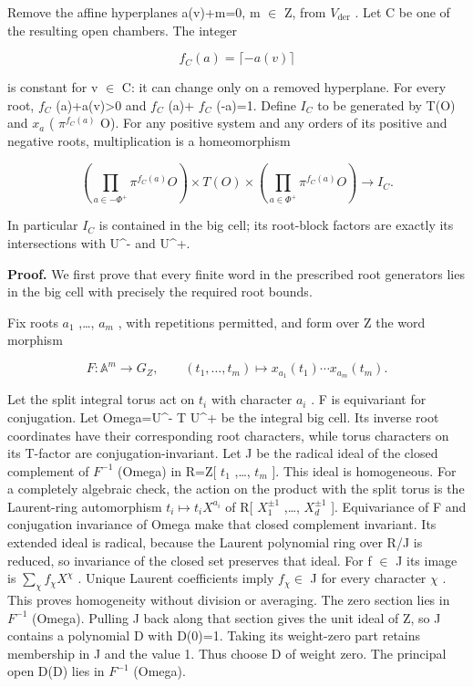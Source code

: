 \documentclass[
  11pt,
]{article}
\begin{document}
Remove the affine hyperplanes a(v)+m=0, m \(\in\) Z, from
\(V_{\mathrm{der}}\) . Let C be one of the resulting open chambers. The
integer

\[
 f_C(a)=\lceil-a(v)\rceil
\]

is constant for v \(\in\) C: it can change only on a removed hyperplane.
For every root, \(f_{C}\) (a)+a(v)\textgreater0 and \(f_{C}\) (a)+
\(f_{C}\) (-a)=1. Define \(I_{C}\) to be generated by T(O) and \(x_{a}\)
( \(\pi^{f_{C}(a)}\) O). For any positive system and any orders of its
positive and negative roots, multiplication is a homeomorphism

\[
 \left(\prod_{a\in-\Phi^+}\pi^{f_C(a)}O\right)
 \times T(O)\times
 \left(\prod_{a\in\Phi^+}\pi^{f_C(a)}O\right)
 \longrightarrow I_C.
 \tag{BF.11}
\]

In particular \(I_{C}\) is contained in the big cell; its root-block
factors are exactly its intersections with U\^{}- and U\^{}+.

\textbf{Proof.} We first prove that every finite word in the prescribed
root generators lies in the big cell with precisely the required root
bounds.

Fix roots \(a_{1}\) ,\ldots, \(a_{m}\) , with repetitions permitted, and
form over Z the word morphism

\[
 F:\mathbb A^m\to G_Z,\qquad
 (t_1,\ldots,t_m)\mapsto x_{a_1}(t_1)\cdots x_{a_m}(t_m).
\]

Let the split integral torus act on \(t_{i}\) with character \(a_{i}\) .
F is equivariant for conjugation. Let Omega=U\^{}- T U\^{}+ be the
integral big cell. Its inverse root coordinates have their corresponding
root characters, while torus characters on its T-factor are
conjugation-invariant. Let J be the radical ideal of the closed
complement of \(F^{-1}\) (Omega) in R=Z{[} \(t_{1}\) ,\ldots, \(t_{m}\)
{]}. This ideal is homogeneous. For a completely algebraic check, the
action on the product with the split torus is the Laurent-ring
automorphism \(t_{i} \mapsto t_{i} X^{a_{i}}\) of R{[} \(X_{1}^{±1}\)
,\ldots, \(X_{d}^{±1}\) {]}. Equivariance of F and conjugation
invariance of Omega make that closed complement invariant. Its extended
ideal is radical, because the Laurent polynomial ring over R/J is
reduced, so invariance of the closed set preserves that ideal. For f
\(\in\) J its image is \(\sum_{\chi} f_{\chi} X^\chi\) . Unique Laurent
coefficients imply \(f_{\chi} \in\) J for every character \(\chi\) .
This proves homogeneity without division or averaging. The zero section
lies in \(F^{-1}\) (Omega). Pulling J back along that section gives the
unit ideal of Z, so J contains a polynomial D with D(0)=1. Taking its
weight-zero part retains membership in J and the value 1. Thus choose D
of weight zero. The principal open D(D) lies in \(F^{-1}\) (Omega).
\end{document}
